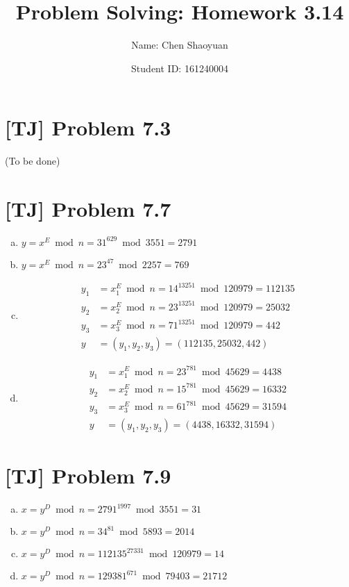 \documentclass[a4paper,11pt]{article}
\newcommand{\homeworkno}{3.14}
\begin{document}
  \title{Problem Solving: Homework \homeworkno}
  \author{Name: Chen Shaoyuan \and Student ID: 161240004}
  \maketitle

  \section{[TJ] Problem 7.3}
  (To be done)

  \section{[TJ] Problem 7.7}
  \begin{enumerate}[(a)]
    \item $y = x^E \bmod n = 31^{629} \bmod 3551 = 2791$
    \item $y = x^E \bmod n = 23^{47} \bmod 2257 = 769$
    \item
      \begin{align*}
        y_1 &= x_1^E \bmod n = 14^{13251} \bmod 120979 = 112135 \\
        y_2 &= x_2^E \bmod n = 23^{13251} \bmod 120979 = 25032 \\
        y_3 &= x_3^E \bmod n = 71^{13251} \bmod 120979 = 442 \\
        y &= (y_1, y_2, y_3) = (112135, 25032, 442)
      \end{align*}
    \item
      \begin{align*}
        y_1 &= x_1^E \bmod n = 23^{781} \bmod 45629 = 4438 \\
        y_2 &= x_2^E \bmod n = 15^{781} \bmod 45629 = 16332 \\
        y_3 &= x_3^E \bmod n = 61^{781} \bmod 45629 = 31594 \\
        y &= (y_1, y_2, y_3) = (4438, 16332, 31594)
      \end{align*}
  \end{enumerate}

  \section{[TJ] Problem 7.9}
  \begin{enumerate}[(a)]
    \item $ x = y^D \bmod n = 2791^{1997} \bmod 3551 = 31$
    \item $ x = y^D \bmod n = 34^{81} \bmod 5893 = 2014$
    \item $ x = y^D \bmod n = 112135^{27331} \bmod 120979 = 14$
    \item $ x = y^D \bmod n = 129381^{671} \bmod 79403 = 21712$
  \end{enumerate}
\end{document}
